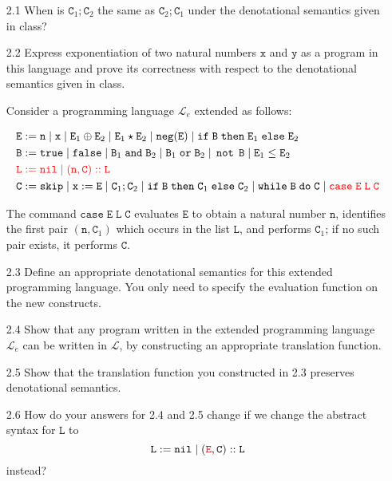 \documentclass[a4paper,10pt]{article}
\newcommand{\E}{\mathtt{E}}
\newcommand{\B}{\mathtt{B}}
\newcommand{\C}{\mathtt{C}}
\newcommand{\LL}{\mathtt{L}}
\newcommand{\true}{\mathtt{true}}
\newcommand{\false}{\mathtt{false}}
\newcommand{\andsym}{\mathtt{and}}
\newcommand{\orsym}{\mathtt{or}}
\newcommand{\notsym}{\mathop{\mathtt{not}}}
\newcommand{\ifsym}{\mathtt{if}}
\newcommand{\then}{\mathtt{then}}
\newcommand{\elsesym}{\mathtt{else}}
\newcommand{\whilesym}{\mathtt{while}}
\newcommand{\dosym}{\mathtt{do}}
\newcommand{\skipsym}{\mathtt{skip}}
\newcommand{\nil}{\mathtt{nil}}
\newcommand{\case}{\mathtt{case}}
\newcommand{\negation}{\mathtt{neg}}
\newcommand{\question}[1]
{\color{DarkBlue}#1 \color{Black} \newline}
\begin{document}
\begin{enumerate}

\question{
\item[2.1] When is $\C_1 ; \C_2$ the same as $\C_2 ; \C_1$ under the denotational semantics given in class?
}

\question{
\item[2.2] Express exponentiation of two natural numbers $\mathtt{x}$ and $\mathtt{y}$ as a program
in this language and prove its correctness with respect to the denotational semantics given in class.

Consider a programming language $\mathcal{L}_e$ extended as follows:

\begin{align*}
& \E := \mathtt{n} \; | \; \mathtt{x} \; | \; \E_1 \oplus \E_2 \; | \; \E_1 \star \E_2 \; | \; \negation(\E) \; | \; \ifsym \; \B \; \then \; \E_1 \; \elsesym \; \E_2 \\
& \B := \true \; | \; \false \; | \; \B_1 \; \andsym \; \B_2 \; | \; \B_1 \; \orsym \; \B_2 \; | \; \notsym \; \B \; | \; \E_1 \leq \E_2 \\
& {\color{red} \LL := \nil \; | \; (\mathtt{n},\C)::\LL} \\
& \C := \skipsym \; | \; \mathtt{x} := \E \; | \; \C_1 ; \C_2 \; | \; \ifsym \; \B \; \then \; \C_1 \; \elsesym \; \C_2 \; | \; \whilesym \; \B \; \dosym \; \C \; | \; {\color{red} \case \; \E \; \LL \; \C}
\end{align*}

The command $\case \; \E \; \LL \; \C$ evaluates $\E$ to obtain a natural number $\mathtt{n}$,
identifies the first pair $(\mathtt{n},\C_1)$ which occurs in the list $\LL$, and performs $\C_1$;
if no such pair exists, it performs $\C$.
}


\question{
\item[2.3] Define an appropriate denotational semantics for this extended programming language. 
You only need to specify the evaluation function on the new constructs.
}

\question{
\item[2.4] Show that any program written in the extended programming language $\mathcal{L}_e$ 
can be written in $\mathcal{L}$, by constructing an appropriate translation function.
}

\question{
\item[2.5] Show that the translation function you constructed in 2.3 preserves denotational semantics.
}

\question{
\item[2.6] How do your answers for 2.4 and 2.5 change if we change the abstract syntax for $\LL$ to
\[ \LL := \nil \; | \; ({\color{red} \E},\C)::\LL \]
instead?
}

\end{enumerate}
\end{document}
